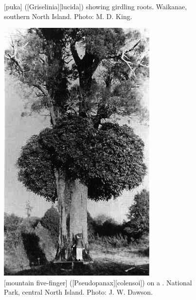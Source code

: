 \begin{figure}[t]
\begin{minipage}[t]{0.9\textwidth}
\begin{minipage}[t]{(\textwidth-\fgap) * \real{0.422}}
			\caption[Puka (\emph{Griselinia lucida}) showing girdling roots]{[puka] ([Griselinia][lucida]) showing girdling roots.
			Waikanae, southern North Island.
			Photo: M. D. King.}%
			\label{fig:48puka-roots}
		\end{minipage}\hspace{\fgap}%
		\begin{minipage}[t]{(\textwidth-\fgap) * \real{0.578}}
			\centering
			\includegraphics[width=\textwidth]{graphics/figure49fivefinger.jpg}
			\caption[Mountain five-finger on a kahikatea]{[mountain five-finger] ([Pseudopanax][colensoi]) on a .
			National Park, central North Island.
			Photo: J. W. Dawson.}%
			\label{fig:49fivefinger}
		\end{minipage}
	\end{minipage}
\end{figure}

